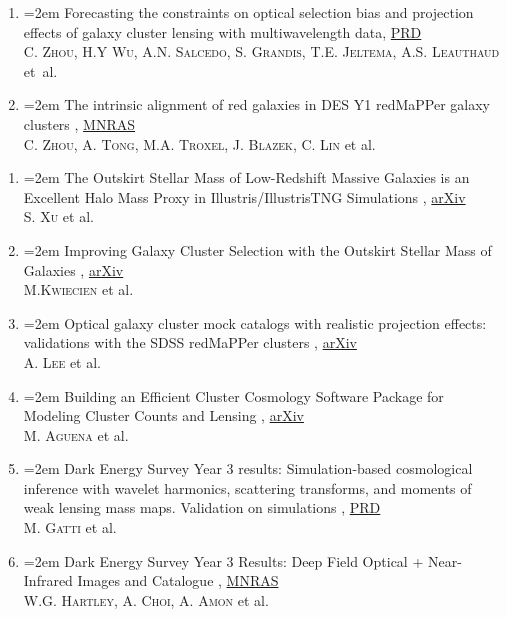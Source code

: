 \documentclass{scrartcl}
\newcommand{\paper}[1]{\noindent\hangindent=2em\hangafter=0 \footnotesize #1  %
\vspace{0.5em}} %
\begin{document}
\begin{cv}{}
\begin{enumerate}
    \item \paper{Forecasting the constraints on optical selection bias and projection effects of galaxy cluster lensing with multiwavelength data, \href{https://journals.aps.org/prd/abstract/10.1103/PhysRevD.110.103508}{PRD} }\\
    \textsc{C. Zhou, H.Y Wu, A.N. Salcedo, S. Grandis, T.E. Jeltema, A.S. Leauthaud} et~al.

    \item \paper{The intrinsic alignment of red galaxies in DES Y1 redMaPPer galaxy clusters}, \href{https://academic.oup.com/mnras/advance-article/doi/10.1093/mnras/stad2712/7264871}{MNRAS} \\
    \textsc{C. Zhou, A. Tong, M.A. Troxel, J. Blazek, C. Lin} et al.

    \end{enumerate}

    \vspace{0.2em}
    \begin{enumerate}
        \item \paper{The Outskirt Stellar Mass of Low-Redshift Massive Galaxies is an Excellent Halo Mass Proxy in Illustris/IllustrisTNG Simulations}, \href{https://arxiv.org/abs/2412.03406}{arXiv}\\
        \textsc{S. Xu} et al.
        \item \paper{Improving Galaxy Cluster Selection with the Outskirt Stellar Mass of Galaxies}, \href{https://arxiv.org/abs/2410.20205}{arXiv}\\
        \textsc{M.Kwiecien} et al.
        \item \paper{Optical galaxy cluster mock catalogs with realistic projection effects: validations with the SDSS redMaPPer clusters}, \href{https://arxiv.org/abs/2410.02497}{arXiv}\\
        \textsc{A. Lee} et al. 
        \item \paper{Building an Efficient Cluster Cosmology Software Package for Modeling Cluster Counts and Lensing}, \href{https://arxiv.org/abs/2309.06593}{arXiv}\\
        \textsc{M. Aguena} et al. 
        \item \paper{Dark Energy Survey Year 3 results: Simulation-based cosmological inference with wavelet harmonics, scattering transforms, and moments of weak lensing mass maps. Validation on simulations}, \href{https://journals.aps.org/prd/abstract/10.1103/PhysRevD.109.063534}{PRD}\\
        \textsc{M. Gatti} et al. 
        \item \paper{Dark Energy Survey Year 3 Results: Deep Field Optical + Near-Infrared Images and Catalogue}, \href{https://academic.oup.com/mnras/article/509/3/3547/6412546}{MNRAS}\\
        \textsc{W.G. Hartley, A. Choi, A. Amon} et al. 
    \end{enumerate}


\end{cv}
\end{document}
